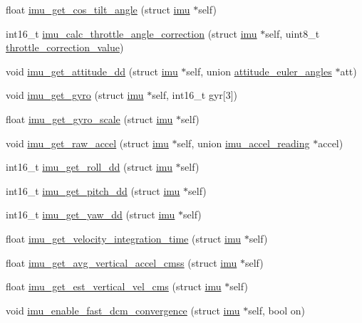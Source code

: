 \begin{DoxyCompactItemize}
\item 
float \hyperlink{group__IMU_ga03d025c898aa2047074e7790c0b01da2}{imu\+\_\+get\+\_\+cos\+\_\+tilt\+\_\+angle} (struct \hyperlink{structimu}{imu} $\ast$self)
\item 
int16\+\_\+t \hyperlink{group__IMU_ga0befbbcf186271e441c96785d81c66c5}{imu\+\_\+calc\+\_\+throttle\+\_\+angle\+\_\+correction} (struct \hyperlink{structimu}{imu} $\ast$self, uint8\+\_\+t \hyperlink{config_2imu_8h_a1a7f9dc5875a0da7f90c1d5e2280f6c9}{throttle\+\_\+correction\+\_\+value})
\item 
void \hyperlink{group__IMU_ga2c57a4c3ff44e2992d937428212ed45e}{imu\+\_\+get\+\_\+attitude\+\_\+dd} (struct \hyperlink{structimu}{imu} $\ast$self, union \hyperlink{unionattitude__euler__angles}{attitude\+\_\+euler\+\_\+angles} $\ast$att)
\item 
void \hyperlink{group__IMU_ga5e93f02a33a72833cf151d7f8bba746a}{imu\+\_\+get\+\_\+gyro} (struct \hyperlink{structimu}{imu} $\ast$self, int16\+\_\+t gyr\mbox{[}3\mbox{]})
\item 
float \hyperlink{group__IMU_gadb23e2588cbfebd30481a7739dc62d03}{imu\+\_\+get\+\_\+gyro\+\_\+scale} (struct \hyperlink{structimu}{imu} $\ast$self)
\item 
void \hyperlink{group__IMU_gad7bc3b9d4043a7984dfbded19f44266f}{imu\+\_\+get\+\_\+raw\+\_\+accel} (struct \hyperlink{structimu}{imu} $\ast$self, union \hyperlink{unionimu__accel__reading}{imu\+\_\+accel\+\_\+reading} $\ast$accel)
\item 
int16\+\_\+t \hyperlink{group__IMU_ga6c751e33a47bf80cbe5aa9d973cf00eb}{imu\+\_\+get\+\_\+roll\+\_\+dd} (struct \hyperlink{structimu}{imu} $\ast$self)
\item 
int16\+\_\+t \hyperlink{group__IMU_ga51949202a657dcd89cd4e2e26d63bd85}{imu\+\_\+get\+\_\+pitch\+\_\+dd} (struct \hyperlink{structimu}{imu} $\ast$self)
\item 
int16\+\_\+t \hyperlink{group__IMU_ga5f87adc76052c88b4e526db2ad435042}{imu\+\_\+get\+\_\+yaw\+\_\+dd} (struct \hyperlink{structimu}{imu} $\ast$self)
\item 
float \hyperlink{group__IMU_ga47fdd7dace913e4a85dd1e8dd7bd07bd}{imu\+\_\+get\+\_\+velocity\+\_\+integration\+\_\+time} (struct \hyperlink{structimu}{imu} $\ast$self)
\item 
float \hyperlink{group__IMU_ga8c43a3d4febb3ab8bf43108ad0f595de}{imu\+\_\+get\+\_\+avg\+\_\+vertical\+\_\+accel\+\_\+cmss} (struct \hyperlink{structimu}{imu} $\ast$self)
\item 
float \hyperlink{group__IMU_ga2c8c5fa5f2f13edc7f1f8442449b2d41}{imu\+\_\+get\+\_\+est\+\_\+vertical\+\_\+vel\+\_\+cms} (struct \hyperlink{structimu}{imu} $\ast$self)
\item 
void \hyperlink{group__IMU_gad46d84705e3777ce1b6a682e1c6b3a34}{imu\+\_\+enable\+\_\+fast\+\_\+dcm\+\_\+convergence} (struct \hyperlink{structimu}{imu} $\ast$self, bool on)
\end{DoxyCompactItemize}


